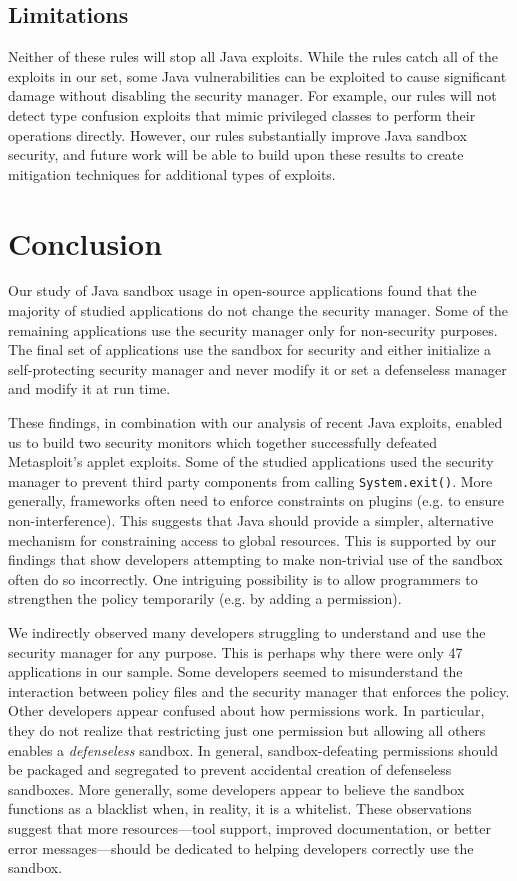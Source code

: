 \documentclass{sig-alternate}
\begin{document}
\subsection{Limitations}

Neither of these rules will stop all Java exploits. While the rules
catch all of the exploits in our set, some Java vulnerabilities can
be exploited to cause significant damage without disabling the security
manager. For example, our rules will not detect type confusion exploits
that mimic privileged classes to perform their operations directly.
However, our rules substantially improve Java sandbox security, and
future work will be able to build upon these results to create mitigation
techniques for additional types of exploits.


\section{Conclusion}

Our study of Java sandbox usage in open-source applications found
that the majority of studied applications do not change the security
manager. Some of the remaining applications use the security manager
only for non-security purposes. The final set of applications use
the sandbox for security and either initialize a self-protecting security
manager and never modify it or set a defenseless manager and modify
it at run time. 

These findings, in combination with our analysis of recent Java exploits,
enabled us to build two security monitors which together successfully
defeated Metasploit's applet exploits. Some of the studied applications
used the security manager to prevent third party components from calling
\texttt{System.exit()}. More generally, frameworks often need to enforce
constraints on plugins (e.g. to ensure non-interference). This suggests
that Java should provide a simpler, alternative mechanism for constraining
access to global resources. This is supported by our findings that
show developers attempting to make non-trivial use of the sandbox
often do so incorrectly. One intriguing possibility is to allow programmers
to strengthen the policy temporarily (e.g. by adding a permission). 

We indirectly observed many developers struggling to understand and
use the security manager for any purpose. This is perhaps why there
were only 47 applications in our sample. Some developers seemed to
misunderstand the interaction between policy files and the security
manager that enforces the policy. Other developers appear confused
about how permissions work. In particular, they do not realize that
restricting just one permission but allowing all others enables a
\emph{defenseless} sandbox. In general, sandbox-defeating permissions
should be packaged and segregated to prevent accidental creation of
defenseless sandboxes. More generally, some developers appear to believe
the sandbox functions as a blacklist when, in reality, it is a whitelist.
These observations suggest that more resources---tool support, improved
documentation, or better error messages---should be dedicated to helping
developers correctly use the sandbox. 



\end{document}
